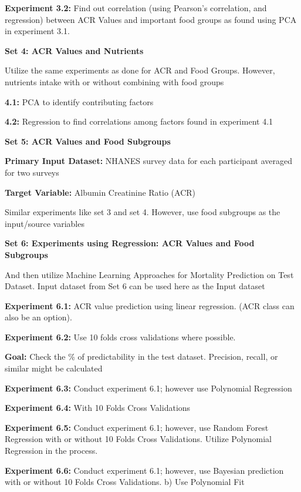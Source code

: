 \noindent \textbf{Experiment 3.2:}  Find out correlation (using Pearson’s correlation, and regression) between ACR Values and important food groups as found using PCA in experiment 3.1.  

\noindent \textbf{Set 4: ACR Values and Nutrients}

\noindent Utilize the same experiments as done for ACR and Food Groups. However, nutrients intake with or without combining with food groups

\noindent \textbf{4.1:} PCA to identify contributing factors

\noindent \textbf{4.2:} Regression to find correlations among factors found in experiment 4.1


\noindent \textbf{Set 5: ACR Values and Food Subgroups}

\noindent \textbf{Primary Input Dataset:} NHANES survey data for each participant averaged for  two surveys

\noindent \textbf{Target Variable:} Albumin Creatinine Ratio (ACR)

\noindent Similar experiments like set 3 and set 4. However, use food subgroups as the input/source variables


\noindent \textbf{Set 6: Experiments using Regression: ACR Values and Food Subgroups}

\noindent And then utilize Machine Learning Approaches for Mortality Prediction on Test Dataset. Input dataset from Set 6 can be used here as the Input dataset

\noindent \textbf{Experiment 6.1:}  ACR value prediction using linear regression. (ACR class can also be an option). 

\noindent \textbf{Experiment 6.2:} Use 10 folds cross validations where possible.

\noindent \textbf{Goal:} Check the \% of predictability in the test dataset. Precision, recall, or similar might be calculated

\noindent \textbf{Experiment 6.3:} Conduct experiment 6.1; however use Polynomial Regression 

\noindent \textbf{Experiment 6.4:} With 10 Folds Cross Validations  

\noindent \textbf{Experiment 6.5:} Conduct experiment 6.1; however, use Random Forest Regression with or without 10 Folds Cross Validations. Utilize Polynomial Regression in the process.

\noindent \textbf{Experiment 6.6:} Conduct experiment 6.1; however, use Bayesian prediction with or without 10 Folds Cross Validations.  b) Use Polynomial Fit

